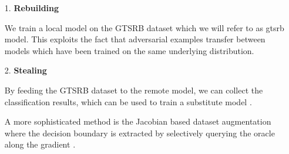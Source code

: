 \begin{enumerate}
\item[1.] \textbf{Rebuilding}

We train a local model on the GTSRB dataset which we will refer to as gtsrb model.
This exploits the fact that adversarial examples transfer between models which have been trained on the same underlying distribution.

\item[2.] \textbf{Stealing}

By feeding the GTSRB dataset to the remote model, we can collect the classification results, which can be used to train a substitute model \cite{tramer2016stealing}.

A more sophisticated method is the Jacobian based dataset augmentation where the decision boundary is extracted by selectively querying the oracle along the gradient \cite{papernot2017practical}.
\end{enumerate}


